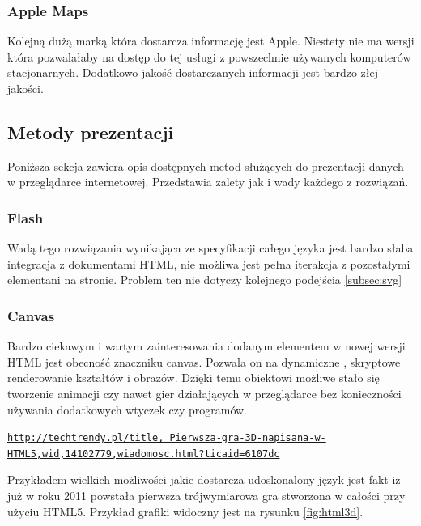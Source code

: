 \subsubsection{Apple Maps}
\label{subsubsec:Apple Maps}

Kolejną dużą marką która dostarcza informację jest Apple. Niestety nie ma wersji która pozwalałaby na dostęp do tej usługi z powszechnie używanych komputerów stacjonarnych. Dodatkowo jakość dostarczanych informacji jest bardzo złej jakości.


\subsection{Metody prezentacji}
\label{subsec:presentation}

Poniższa sekcja zawiera opis dostępnych metod służących do prezentacji danych w przeglądarce internetowej. Przedstawia zalety jak i wady każdego z rozwiązań.


\subsubsection{Flash}
\label{subsubsec:graphicFlash}


Wadą tego rozwiązania wynikająca ze specyfikacji całego języka jest bardzo słaba integracja z dokumentami HTML, nie możliwa jest pełna iterakcja z pozostałymi elementani na stronie. Problem ten nie dotyczy kolejnego podejścia \ref{subsec:svg}

\subsubsection{Canvas}
\label{subsubsec:canvas}


Bardzo ciekawym i wartym zainteresowania dodanym elementem w nowej wersji HTML jest obecność znaczniku canvas. Pozwala on na dynamiczne , skryptowe renderowanie kształtów i obrazów. Dzięki temu obiektowi możliwe stało się tworzenie animacji czy nawet gier działających w przeglądarce bez konieczności używania dodatkowych wtyczek czy programów.

\underline{\texttt{http://techtrendy.pl/title, Pierwsza-gra-3D-napisana-w-HTML5,wid,14102779,wiadomosc.html?ticaid=6107dc}}

Przykładem wielkich możliwości jakie dostarcza udoskonalony język jest fakt iż już w roku 2011 powstała pierwsza trójwymiarowa gra stworzona w całości przy użyciu HTML5. Przykład grafiki widoczny jest na rysunku \ref{fig:html3d}.

